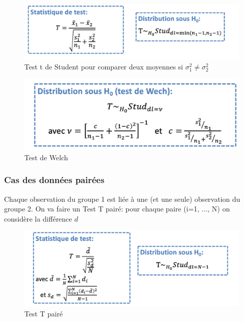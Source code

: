 \begin{figure}[H]
    \centering
    \includegraphics[scale = 0.5]{images/studentbis.png}
    \caption{Test t de Student pour comparer deux moyennes si $\sigma_{1}^{2} \neq \sigma_{2}^{2}$}
    \label{fig:studbis}
\end{figure}

\begin{figure}[H]
    \centering
    \includegraphics[scale = 0.5]{images/Welch.png}
    \caption{Test de Welch}
    \label{fig:welch}
\end{figure}

\subsubsection{Cas des données pairées}
Chaque observation du groupe 1 est liée à une (et une seule)
observation du groupe 2. On va faire un Test T pairé: pour chaque paire (i=1, ..., N) on considère la différence $d$

\begin{figure}[H]
    \centering
    \includegraphics[scale = 0.5]{images/testTpaire.png}
    \caption{Test T pairé}
    \label{fig:my_label}
\end{figure}

